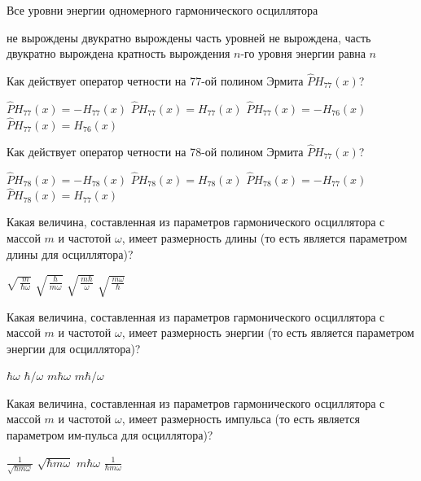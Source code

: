 \documentclass[11pt,a4paper]{exam}
\begin{document}
\begin{questions}
\question Все уровни энергии одномерного гармонического осциллятора 
\begin{choices}
\choice не вырождены
\choice двукратно вырождены
\choice часть уровней не вырождена, часть двукратно вырождена
\choice кратность вырождения $n$-го уровня энергии равна $n$
\end{choices}

\question Как действует оператор четности на 77-ой полином Эрмита $\hat{P}{{H}_{77}}(x)$?
\begin{choices}
\choice $\hat{P}{{H}_{77}}(x)=-{{H}_{77}}(x)$     
\choice $\hat{P}{{H}_{77}}(x)={{H}_{77}}(x)$
\choice $\hat{P}{{H}_{77}}(x)=-{{H}_{76}}(x)$     
\choice $\hat{P}{{H}_{77}}(x)={{H}_{76}}(x)$
\end{choices}

\question Как действует оператор четности на 78-ой полином Эрмита $\hat{P}{{H}_{77}}(x)$?
\begin{choices}
\choice $\hat{P}{{H}_{78}}(x)=-{{H}_{78}}(x)$     
\choice $\hat{P}{{H}_{78}}(x)={{H}_{78}}(x)$
\choice $\hat{P}{{H}_{78}}(x)=-{{H}_{77}}(x)$     
\choice $\hat{P}{{H}_{78}}(x)={{H}_{77}}(x)$
\end{choices}

\question Какая величина, составленная из параметров гармонического осциллятора с массой $m$ и частотой $\omega $, имеет размерность длины (то есть является параметром длины для осциллятора)?
\begin{choices}
\choice $\sqrt{\,\frac{m}{\hbar \omega }}$     
\choice $\sqrt{\,\frac{\hbar }{m\omega }}$     
\choice $\sqrt{\,\frac{m\hbar }{\omega }}$     
\choice $\sqrt{\,\frac{m\omega }{\hbar }}$
\end{choices}

\question Какая величина, составленная из параметров гармонического осциллятора с массой $m$ и частотой $\omega $, имеет размерность энергии (то есть является параметром энергии для осциллятора)?
\begin{choices}
\choice $\hbar \omega $         
\choice $\hbar /\omega $     
\choice $m\hbar \omega $     
\choice $m\hbar /\omega $
\end{choices}

\question Какая величина, составленная из параметров гармонического осциллятора с массой $m$ и частотой $\omega $, имеет размерность импульса (то есть является параметром им-пульса для осциллятора)?
\begin{choices}
\choice $\frac{1}{\sqrt{\hbar m\omega }}$      
\choice $\sqrt{\hbar m\omega }$       
\choice $m\hbar \omega $     
\choice $\frac{1}{\hbar m\omega }$
\end{choices}


\end{questions}
\end{document}
